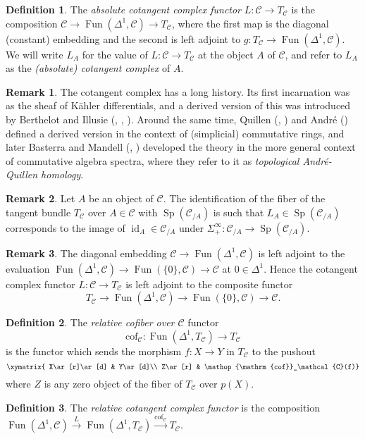 \documentclass{article}
\theoremstyle{definition}
\newtheorem{definition}{Definition}[subsection]
\newtheorem{remark}{Remark}[subsection]
\newcommand{\C}{\mathcal{C}}
\newcommand{\too}{\longrightarrow}
\DeclareMathOperator{\cof}{cof}
\DeclareMathOperator{\Fun}{Fun}
\DeclareMathOperator{\id}{id}
\DeclareMathOperator{\Sp}{Sp}
\begin{document}
\begin{definition}
The {\em absolute cotangent complex functor}
$L:\C\to T_\C$ is  the composition $\C\to\Fun(\Delta^1,\C)\to T_\C$, where the first map is the diagonal (constant) embedding and the second is left adjoint to $g:T_\C\to\Fun(\Delta^1,\C)$.
We will write $L_A$ for the value of $L:\C\to T_\C$ at the object $A$ of $\C$, and refer to $L_A$ as the {\em (absolute) cotangent complex} of $A$.
\end{definition}
\begin{remark}
The cotangent complex has a long history.
Its first incarnation was as the sheaf of K\"ahler differentials, and a derived version of this was introduced by Berthelot and Illusie (\cite{SGA6}, \cite{Il71}, \cite{Il72}). 
Around the same time, Quillen (\cite{Qu67}, \cite{Qu70}) and Andr\'e (\cite{An74}) defined a derived version in the context of (simplicial) commutative rings, and later Basterra and Mandell (\cite{Ba99}, \cite{BM05}) developed the theory in the more general context of commutative algebra spectra, where they refer to it as {\em topological Andr\'e-Quillen homology}.
\end{remark}
\begin{remark}
Let $A$ be an object of $\C$.
The identification of the fiber of the tangent bundle $T_\C$ over $A\in\C$ with $\Sp(\C_{/A})$ is such that $L_A\in\Sp(\C_{/A})$ corresponds to the image of $\id_A\in\C_{/A}$ under  $\Sigma^\infty_+:\C_{/A}\to\Sp(\C_{/A})$.
\end{remark}
\begin{remark}
The diagonal embedding $\C\to\Fun(\Delta^1,\C)$ is left adjoint to the evaluation $\Fun(\Delta^1,\C)\to\Fun(\{0\},\C)\to\C$ at $0\in\Delta^1$. Hence the cotangent complex functor $L:\C\to T_\C$ is left adjoint to the composite functor
\[
T_\C\too\Fun(\Delta^1,\C)\too\Fun(\{0\},\C)\to\C.
\]
\end{remark}
\begin{definition}
The {\em relative cofiber over $\C$} functor
\[
\mathrm{cof}_\C\colon\Fun(\Delta^1,T_\C)\to T_\C
\]
is the functor which sends the morphism $f:X\to Y$ in $T_\C$ to the pushout
\[
\xymatrix{
X\ar[r]\ar[d] & Y\ar[d]\\
Z\ar[r] & \cof_\C(f)}
\]
where $Z$ is any zero object of the fiber of $T_\C$ over $p(X)$.
\end{definition}
\begin{definition}
The {\em relative cotangent complex functor} is the composition
$
\Fun(\Delta^1,\C)\overset{L}{\too}\Fun(\Delta^1,T_\C)\overset{\mathrm{cof}_\C}{\too} T_\C.
$
\end{definition}
\end{document}
